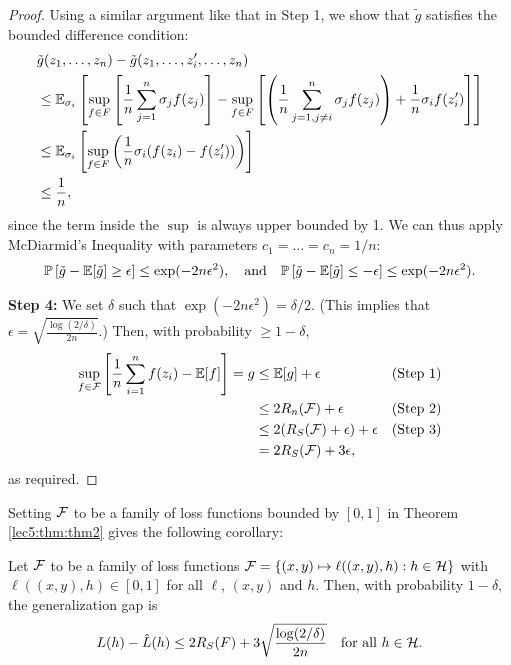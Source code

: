 \begin{proof}
Using a similar argument like that in Step 1, we show that $\tilde g$ satisfies the bounded difference condition:
\begin{align}
    &\tilde g(z_1, \dots, z_n) - \tilde g(z_1, \dots, z_i', \dots, z_n) \nonumber \\
    &\leq \mathbb E_{\sigma_i} \left[\sup_{f\in F} \left[ \frac{1}{n} \sum^{n}_{j=1} \sigma_j f(z_j) \right] - \sup_{f\in F} \left[ \left(\frac{1}{n} \sum^{n}_{j=1, j \neq i} \sigma_j f(z_j)\right) + \frac{1}{n} \sigma_if(z_i')\right]\right]\\
    &\leq \mathbb E_{\sigma_i}\left[\sup_{f\in F} \left(\frac{1}{n} \sigma_i(f(z_i) - f(z_i'))\right)\right] \\
    &\leq \frac{1}{n},
\end{align}
since the term inside the $\sup$ is always upper bounded by 1. We can thus apply McDiarmid's Inequality with parameters $c_1 = \dots = c_n = 1/n$:
\begin{align}
    \mathbb P\left[ \tilde g - \mathbb E[\tilde g] \geq \epsilon \right] \leq \exp(-2n \epsilon^2), \quad\text{and}\quad
    \mathbb P\left[ \tilde g - \mathbb E[\tilde g] \leq -\epsilon \right] \leq \exp(-2n \epsilon^2).
\end{align}

\textbf{Step 4:} We set $\delta$ such that $\exp(-2n \epsilon^2) = \delta/2$. (This implies that $\epsilon = \sqrt{\frac{\log(2/\delta)}{2n}}$.) Then, with probability $\geq 1 - \delta$,
\begin{align}
    \sup_{f\in \mathcal F} \left[ \frac{1}{n} \sum^n_{i=1} f(z_i) - \mathbb E[f]\right] = g &\leq \mathbb E[g] + \epsilon &\text{(Step 1)} \\
    &\leq 2R_n(\mathcal F) + \epsilon &\text{(Step 2)} \\
    &\leq 2(R_S(\mathcal F) + \epsilon) + \epsilon &\text{(Step 3)} \\
    &= 2R_S(\mathcal F) + 3\epsilon,
\end{align}
as required.
\end{proof}

Setting $\mathcal F$ to be a family of loss functions bounded by $[0,1]$ in Theorem \ref{lec5:thm:thm2} gives the following corollary:
\begin{corollary}
Let $\mathcal F$ to be a family of loss functions $\mathcal F = \left\{ (x,y) \mapsto \ell((x,y),h): h \in \mathcal H \right\}$ with $\ell((x,y), h) \in [0,1]$ for all $\ell$, $(x,y)$ and $h$. Then, with probability $1-\delta,$ the generalization gap is
    \begin{align*}
        L(h) - \hat L(h) \leq 2R_S(F) + 3\sqrt{\frac{\log(2/\delta)}{2n}} \quad \text{for all } h\in \mathcal H.
    \end{align*}
\end{corollary}